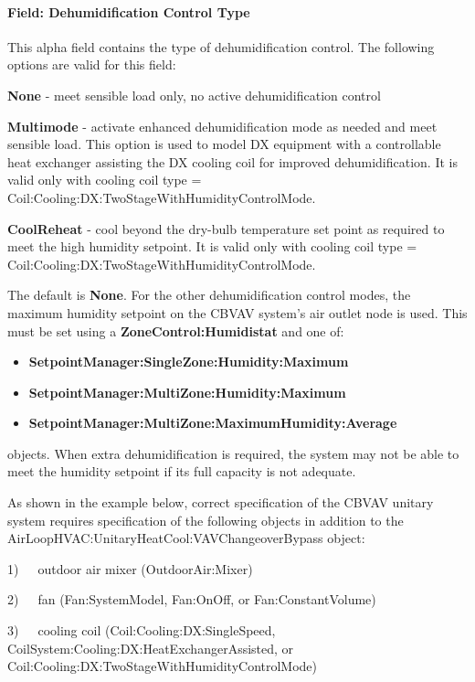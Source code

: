 \paragraph{Field: Dehumidification Control Type}\label{field-dehumidification-control-type-5-000}

This alpha field contains the type of dehumidification control. The following options are valid for this field:

\textbf{None} - meet sensible load only, no active dehumidification control

\textbf{Multimode} - activate enhanced dehumidification mode as needed and meet sensible load. This option is used to model DX equipment with a controllable heat exchanger assisting the DX cooling coil for improved dehumidification. It is valid only with cooling coil type = Coil:Cooling:DX:TwoStageWithHumidityControlMode.

\textbf{CoolReheat} - cool beyond the dry-bulb temperature set point as required to meet the high humidity setpoint. It is valid only with cooling coil type = Coil:Cooling:DX:TwoStageWithHumidityControlMode.

The default is \textbf{None}. For the other dehumidification control modes, the maximum humidity setpoint on the CBVAV system's air outlet node is used. This must be set using a \textbf{ZoneControl:Humidistat} and one of:

\begin{itemize}
\item
  \textbf{SetpointManager:SingleZone:Humidity:Maximum}
\item
  \textbf{SetpointManager:MultiZone:Humidity:Maximum}
\item
  \textbf{SetpointManager:MultiZone:MaximumHumidity:Average}
\end{itemize}

objects. When extra dehumidification is required, the system may not be able to meet the humidity setpoint if its full capacity is not adequate.

As shown in the example below, correct specification of the CBVAV unitary system requires specification of the following objects in addition to the AirLoopHVAC:UnitaryHeatCool:VAVChangeoverBypass object:

1)~~~outdoor air mixer (OutdoorAir:Mixer)

2)~~~fan (Fan:SystemModel, Fan:OnOff, or Fan:ConstantVolume)

3)~~~cooling coil (Coil:Cooling:DX:SingleSpeed, CoilSystem:Cooling:DX:HeatExchangerAssisted, or Coil:Cooling:DX:TwoStageWithHumidityControlMode)

